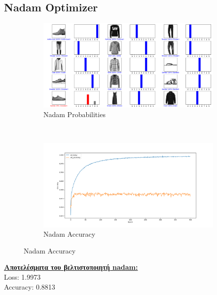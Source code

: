 \documentclass{article}
\begin{document}
\subsection*{Nadam Optimizer}
	\begin{figure}[h!]
		\centering
		\begin{subfigure}[t]{0.5\textwidth}
			\centering
			\includegraphics[width=\linewidth]{../exercise3_3/images/fashion_nadam_probabilities.png}
			\caption{Nadam Probabilities}
		\end{subfigure}%
		~
		\begin{subfigure}[t]{0.5\textwidth}
			\centering
			\includegraphics[width=\linewidth]{../exercise3_3/images/fashion_nadam_accuracy.png}
			\caption{Nadam Accuracy}
		\end{subfigure}
	\end{figure}
	\noindent
	\textbf{\underline{Aποτελέσματα του βελτιστοποιητή nadam:}}\\
	Loss: 1.9973 \\
	Accuracy: 0.8813

\pagebreak
\end{document}
